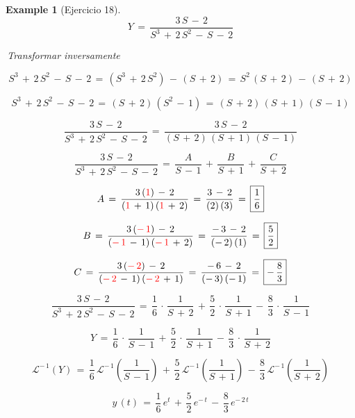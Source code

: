 \documentclass[a4paper,11pt,openany]{book}
\newtheorem{exmp}{Example}[section]
\begin{document}
\begin{exmp}[Ejercicio 18]
$$Y\,=\,\dfrac{3\,S\,-\,2}{S^{3}\,+\,2\,S^{2}\,-\,S\,-\,2}$$

\textcolor{ao(english)}{}\,Transformar inversamente

\textcolor{ao(english)}{}$$S^{3}\,+\,2\,S^{2}\,-\,S\,-\,2\,=\,(S^{3}\,+\,2\,S^{2})\,-\,(S\,+\,2)\,=\,S^{2}\,(S\,+\,2)\,-\,(S\,+\,2)$$

\textcolor{ao(english)}{}$$S^{3}\,+\,2\,S^{2}\,-\,S\,-\,2\,=\,(S\,+\,2)\,(S^{2}\,-\,1)\,=\,(S\,+\,2)\,(S\,+\,1)\,(S\,-\,1)$$

\textcolor{ao(english)}{}$$\dfrac{3\,S\,-\,2}{S^{3}\,+\,2\,S^{2}\,-\,S\,-\,2}\,=\,\dfrac{3\,S\,-\,2}{(S\,+\,2)\,(S\,+\,1)\,(S\,-\,1)}$$

\textcolor{ao(english)}{}$$\dfrac{3\,S\,-\,2}{S^{3}\,+\,2\,S^{2}\,-\,S\,-\,2}\,=\,\dfrac{A}{S\,-\,1}\,+\,\dfrac{B}{S\,+\,1}\,+\,\dfrac{C}{S\,+\,2}$$

\textcolor{ao(english)}{}$$A\,=\,\dfrac{3\,(\textcolor{red}{1})\,-\,2}{(\textcolor{red}{1}\,+\,1)\,(\textcolor{red}{1}\,+\,2)}\,=\,\dfrac{3\,-\,2}{(2)\,(3)}\,=\,\boxed{\dfrac{1}{6}}$$

\textcolor{ao(english)}{}$$B\,=\,\dfrac{3\,(\textcolor{red}{-\,1})\,-\,2}{(\textcolor{red}{-\,1}\,-\,1)\,(\textcolor{red}{-\,1}\,+\,2)}\,=\,\dfrac{-\,3\,-\,2}{(-\,2)\,(1)}\,=\,\boxed{\dfrac{5}{2}}$$

\textcolor{ao(english)}{}$$C\,=\,\dfrac{3\,(\textcolor{red}{-\,2})\,-\,2}{(\textcolor{red}{-\,2}\,-\,1)\,(\textcolor{red}{-\,2}\,+\,1)}\,=\,\dfrac{-\,6\,-\,2}{(-\,3)\,(-\,1)}\,=\,\boxed{-\,\dfrac{8}{3}}$$

\textcolor{ao(english)}{}$$\dfrac{3\,S\,-\,2}{S^{3}\,+\,2\,S^{2}\,-\,S\,-\,2}\,=\,\dfrac{1}{6}\,\cdot\,\dfrac{1}{S\,+\,2}\,+\,\dfrac{5}{2}\,\cdot\,\dfrac{1}{S\,+\,1}\,-\,\dfrac{8}{3}\,\cdot\,\dfrac{1}{S\,-\,1}$$

\textcolor{ao(english)}{}$$Y\,=\,\dfrac{1}{6}\,\cdot\,\dfrac{1}{S\,-\,1}\,+\,\dfrac{5}{2}\,\cdot\,\dfrac{1}{S\,+\,1}\,-\,\dfrac{8}{3}\,\cdot\,\dfrac{1}{S\,+\,2}$$

$$\mathcal{L}^{-\,1}\left(Y\right)\,=\,\dfrac{1}{6}\,\mathcal{L}^{-\,1}\left(\dfrac{1}{S\,-\,1}\right)\,+\,\dfrac{5}{2}\,\mathcal{L}^{-\,1}\left(\dfrac{1}{S\,+\,1}\right)\,-\,\dfrac{8}{3}\,\mathcal{L}^{-\,1}\left(\dfrac{1}{S\,+\,2}\right)$$

$$\boxed{y\,(t)\,=\,\dfrac{1}{6}\,e^{t}\,+\,\dfrac{5}{2}\,e^{-\,t}\,-\,\dfrac{8}{3}\,e^{-\,2\,t}}$$

\end{exmp}
\end{document}
